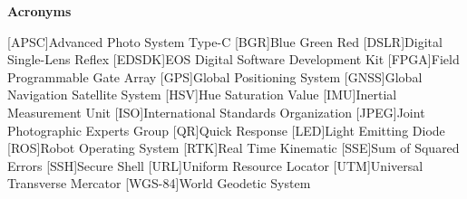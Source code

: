 
\vspace*{0.2cm}
\begin{center}
{\bf \Huge Acronyms}
\end{center}

\begin{acronym}[EDSDK] %

[APSC]{Advanced Photo System Type-C}
[BGR]{Blue Green Red}
[DSLR]{Digital Single-Lens Reflex}
[EDSDK]{EOS Digital Software Development Kit}
[FPGA]{Field Programmable Gate Array}
[GPS]{Global Positioning System}
[GNSS]{Global Navigation Satellite System}
[HSV]{Hue Saturation Value}
[IMU]{Inertial Measurement Unit}
[ISO]{International Standards Organization}
[JPEG]{Joint Photographic Experts Group}
[QR]{Quick Response}
[LED]{Light Emitting Diode}
[ROS]{Robot Operating System}
[RTK]{Real Time Kinematic}
[SSE]{Sum of Squared Errors}
[SSH]{Secure Shell}
[URL]{Uniform Resource Locator}
[UTM]{Universal Transverse Mercator}
[WGS-84]{World Geodetic System}

\end{acronym}




